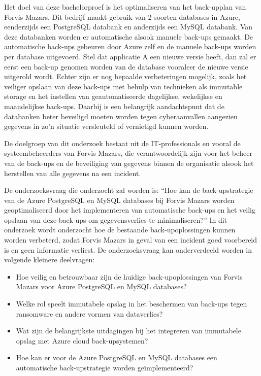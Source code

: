 Het doel van deze bachelorproef is het optimaliseren van het back-upplan van Forvis Mazars. Dit bedrijf maakt gebruik van 2 soorten databases in Azure, eenderzijds een PostgreSQL databank en anderzijds een MySQL databank. Van deze databanken worden er automatische alsook manuele back-ups gemaakt. De automatische back-ups gebeuren door Azure zelf en de manuele back-ups worden per database uitgevoerd. Stel dat applicatie A een nieuwe versie heeft, dan zal er eerst een back-up genomen worden van de database vooraleer de nieuwe versie uitgerold wordt. Echter zijn er nog bepaalde verbeteringen mogelijk, zoals het veiliger opslaan van deze back-ups met behulp van technieken als immutable storage en het instellen van geautomatiseerde dagelijkse, wekelijkse en maandelijkse back-ups. Daarbij is een belangrijk aandachtspunt dat de databanken beter beveiligd moeten worden tegen cyberaanvallen aangezien gegevens in zo'n situatie versleuteld of vernietigd kunnen worden.

De doelgroep van dit onderzoek bestaat uit de IT-professionals en vooral de systeembeheerders van Forvis Mazars, die verantwoordelijk zijn voor het beheer van de back-ups en de beveiliging van gegevens binnen de organisatie alsook het herstellen van alle gegevens na een incident.

De onderzoeksvraag die onderzocht zal worden is: ``Hoe kan de back-upstrategie van de Azure PostgreSQL en MySQL databases bij Forvis Mazars worden geoptimaliseerd door het implementeren van automatische back-ups en het veilig opslaan van deze back-ups om gegevensverlies te minimaliseren?'' In dit onderzoek wordt onderzocht hoe de bestaande back-upoplossingen kunnen worden verbeterd, zodat Forvis Mazars in geval van een incident goed voorbereid is en geen informatie verliest. De onderzoeksvraag kan onderverdeeld worden in volgende kleinere deelvragen:
\begin{itemize}
    \item Hoe veilig en betrouwbaar zijn de huidige back-upoplossingen van Forvis Mazars voor Azure PostgreSQL en MySQL databases?
    \item Welke rol speelt immutabele opslag in het beschermen van back-ups tegen ransomware en andere vormen van dataverlies?
    \item Wat zijn de belangrijkste uitdagingen bij het integreren van immutabele opslag met Azure cloud back-upsystemen?
    \item Hoe kan er voor de Azure PostgreSQL en MySQL databases een automatische back-upstrategie worden geïmplementeerd?
\end{itemize}

